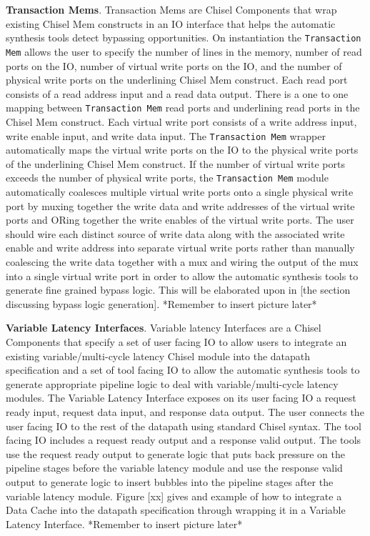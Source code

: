 {\bf Transaction Mems}. Transaction Mems are Chisel Components that
wrap existing Chisel Mem constructs in an IO interface that helps the
automatic synthesis tools detect bypassing opportunities. On
instantiation the {\tt Transaction Mem} allows the user to specify the
number of lines in the memory, number of read ports on the IO, number
of virtual write ports on the IO, and the number of physical write
ports on the underlining Chisel Mem construct. Each read port consists
of a read address input and a read data output. There is a one to one
mapping between {\tt Transaction Mem} read ports and underlining read ports
in the Chisel Mem construct. Each virtual write port consists of a
write address input, write enable input, and write data input. The
{\tt Transaction Mem} wrapper automatically maps the virtual write ports on
the IO to the physical write ports of the underlining Chisel Mem
construct. If the number of virtual write ports exceeds the number of
physical write ports, the {\tt Transaction Mem} module automatically
coalesces multiple virtual write ports onto a single physical write
port by muxing together the write data and write addresses of the
virtual write ports and ORing together the write enables of the
virtual write ports. The user should wire each distinct source of
write data along with the associated write enable and write address
into separate virtual write ports rather than manually coalescing the
write data together with a mux and wiring the output of the mux into
a single virtual write port in order to allow the automatic synthesis
tools to generate fine grained bypass logic. This will be elaborated
upon in [the section discussing bypass logic generation]. *Remember to
insert picture later*

{\bf Variable Latency Interfaces}. Variable latency Interfaces are a
Chisel Components that specify a set of user facing IO to allow users
to integrate an existing variable/multi-cycle latency Chisel module
into the datapath specification and a set of tool facing IO to allow
the automatic synthesis tools to generate appropriate pipeline logic
to deal with variable/multi-cycle latency modules. The Variable
Latency Interface exposes on its user facing IO a request ready input,
request data input, and response data output. The user connects the
user facing IO to the rest of the datapath using standard Chisel
syntax. The tool facing IO includes a request ready output and a
response valid output. The tools use the request ready output to
generate logic that puts back pressure on the pipeline stages before
the variable latency module and use the response valid output to
generate logic to insert bubbles into the pipeline stages after the
variable latency module. Figure [xx] gives and example of how to
integrate a Data Cache into the datapath specification through
wrapping it in a Variable Latency Interface. *Remember to insert
picture later*

